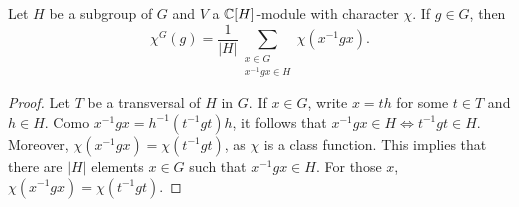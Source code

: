 \begin{corollary}
\label{cor:induccion}
    Let $H$ be a subgroup of $G$ 
    and $V$ a $\mathbb{C}[H]$-module with character $\chi$.
    If $g\in G$, then 
    \[
    \chi^G(g)=\frac{1}{|H|}\sum_{\substack{x\in G\\x^{-1}gx\in H}}\chi(x^{-1}gx).
    \]
\end{corollary}

\begin{proof}
    Let $T$ be a transversal of $H$ in $G$. If $x\in G$, write $x=th$ for some $t\in T$ and $h\in H$. 
    Como $x^{-1}gx=h^{-1}(t^{-1}gt)h$, it follows that $x^{-1}gx\in H\Longleftrightarrow t^{-1}gt\in H$. Moreover,   
    $\chi(x^{-1}gx)=\chi(t^{-1}gt)$, as $\chi$ is a class function. This implies that there are $|H|$ elements $x\in G$ 
    such that $x^{-1}gx\in H$. For those $x$, $\chi(x^{-1}gx)=\chi(t^{-1}gt)$. 
\end{proof}
